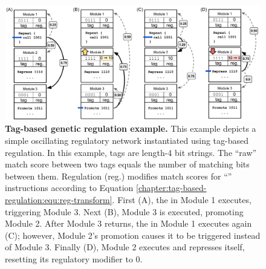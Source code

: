 \begin{figure}[ht!]
    \centering
    \includegraphics[width=\textwidth]{chapters/05-tag-based-genetic-regulation/media/regulation-example.pdf}
    \caption{\small
    \textbf{Tag-based genetic regulation example.}
    This example depicts a simple oscillating regulatory network instantiated using tag-based regulation.
    In this example, tags are length-4 bit strings. 
    The ``raw'' match score between two tags equals the number of matching bits between them.
    Regulation (reg.) modifies match scores for ``'' instructions according to Equation \ref{chapter:tag-based-regulation:equ:reg-transform}.
    First (A), the  in Module 1 executes, triggering Module 3. 
    Next (B), Module 3 is executed, promoting Module 2. 
    After Module 3 returns, the  in Module 1 executes again (C); however, Module 2's promotion causes it to be triggered instead of Module 3. 
    Finally (D), Module 2 executes and represses itself, resetting its regulatory modifier to 0. 
    }
    \label{chapter:tag-based-regulation:fig:regulation-example}
\end{figure}
